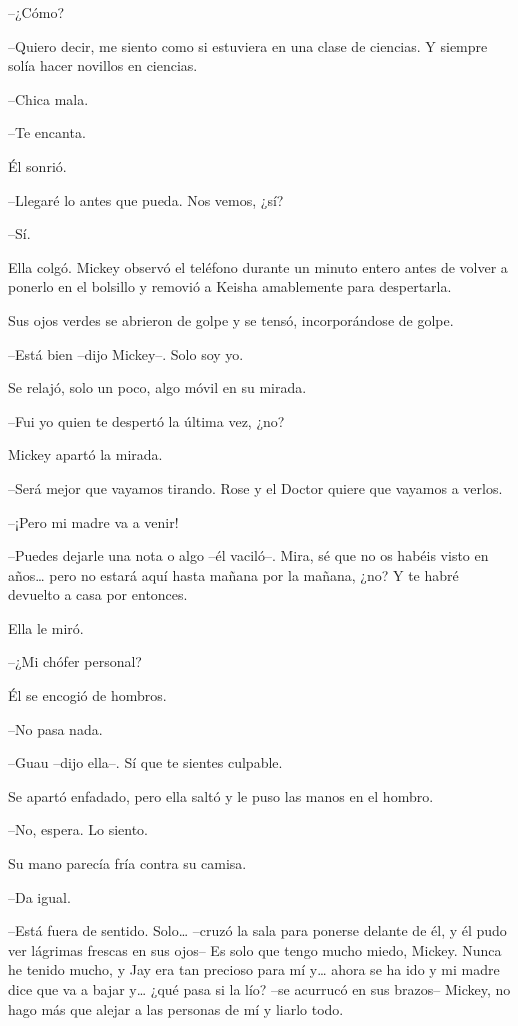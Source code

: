 {--¿Cómo?}

{--Quiero decir, me siento como si estuviera en una clase de ciencias. Y
siempre solía hacer novillos en ciencias.}

{--Chica mala.}

{--Te encanta.}

{Él sonrió.}

{--Llegaré lo antes que pueda. Nos vemos, ¿sí?}

{--Sí.}

{Ella colgó. Mickey observó el teléfono durante un minuto entero antes
 de volver a ponerlo en el bolsillo y removió a Keisha amablemente para
despertarla.}

{Sus ojos verdes se abrieron de golpe y se tensó, incorporándose de
golpe.}

{--Está bien --dijo Mickey--. Solo soy yo.}

{Se relajó, solo un poco, algo móvil en su mirada.}

{--Fui yo quien te despertó la última vez, ¿no?}

{Mickey apartó la mirada.}

{--Será mejor que vayamos tirando. Rose y el Doctor quiere que vayamos a
verlos.}

{--¡Pero mi madre va a venir!}

{--Puedes dejarle una nota o algo --él vaciló--. Mira, sé que no os
 habéis visto en años\ldots{} pero no estará aquí hasta mañana por la
mañana, ¿no? Y te habré devuelto a casa por entonces.}

{Ella le miró.}

{--¿Mi chófer personal?}

{Él se encogió de hombros.}

{--No pasa nada.}

{--Guau --dijo ella--. Sí que te sientes culpable.}

{Se apartó enfadado, pero ella saltó y le puso las manos en el hombro.}

{--No, espera. Lo siento.}

{Su mano parecía fría contra su camisa.}

{--Da igual.}

{--Está fuera de sentido. Solo\ldots{} --cruzó la sala para ponerse
 delante de él, y él pudo ver lágrimas frescas en sus ojos-- Es solo que
 tengo mucho miedo, Mickey. Nunca he tenido mucho, y Jay era tan precioso
 para mí y\ldots{} ahora se ha ido y mi madre dice que va a bajar
 y\ldots{} ¿qué pasa si la lío? --se acurrucó en sus brazos-- Mickey, no
hago más que alejar a las personas de mí y liarlo todo.}


